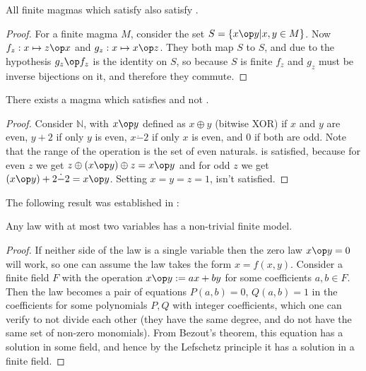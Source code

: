 \begin{theorem}\label{finite_imp_3994_3588_thm}
  \leanok
  All finite magmas which satisfy  also satisfy .
\end{theorem}

\begin{proof}\label{finite_imp_3994_3588} \leanok
  For a finite magma $M$, consider the set $S = \{x \op y | x, y \in M\}$.
  Now $f_z : x \mapsto z \op x$ and $g_z : x \mapsto x \op z$.
  They both map $S$ to $S$, and due to the hypothesis $g_z \op f_z$ is the identity on $S$,
  so because $S$ is finite $f_z$ and $g_z$ must be inverse bijections on it, and therefore
  they commute.
\end{proof}

\begin{theorem}\label{non_imp_3994_3588_thm}
  \leanok
  There exists a magma which satisfies  and not .
\end{theorem}

\begin{proof} \leanok
  Consider $\mathbb{N}$, with $x \op y$ defined as $x \oplus y$ (bitwise XOR) if $x$ and $y$ are even,
  $y+2$ if only $y$ is even, $x \dot - 2$ if only $x$ is even, and $0$ if both are odd.
  Note that the range of the operation is the set of even naturals.
   is satisfied, because for even $z$ we get $z \oplus (x \op y) \oplus z = x \op y$
  and for odd $z$ we get $(x \op y) + 2 \dot - 2 = x \op y$.
  Setting $x = y = z = 1$,  isn't satisfied.
\end{proof}

The following result was established in \cite{austin_finite}:

\begin{theorem}\label{austin-two}\leanok Any law with at most two variables has a non-trivial finite model.
\end{theorem}

\begin{proof} \leanok  If neither side of the law is a single variable then the zero law $x \op y = 0$ will work, so one can assume the law takes the form $x = f(x,y)$.  Consider a finite field $F$ with the operation $x \op y := ax+by$ for some coefficients $a,b \in F$.  Then the law becomes a pair of equations $P(a,b)=0$, $Q(a,b)=1$ in the coefficients for some polynomials $P,Q$ with integer coefficients, which one can verify to not divide each other (they have the same degree, and do not have the same set of non-zero monomials).  From Bezout's theorem, this equation has a solution in some field, and hence by the Lefschetz principle it has a solution in a finite field.
\end{proof}

